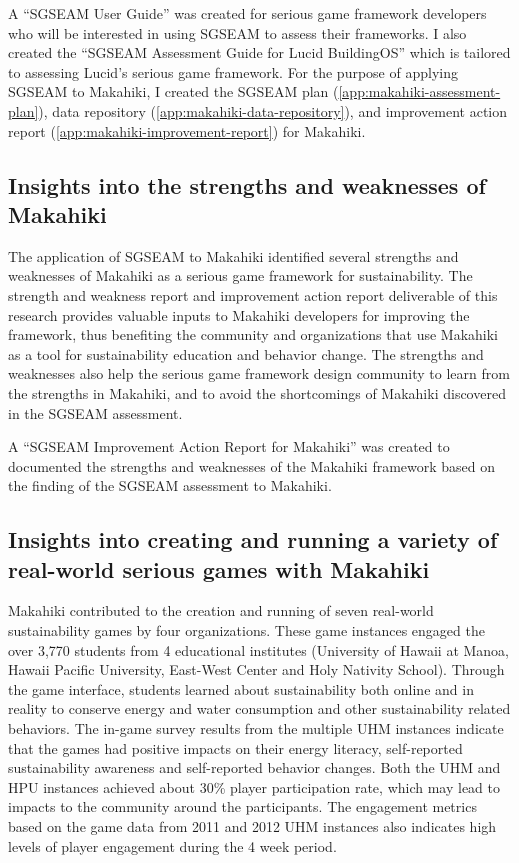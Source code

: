 A ``SGSEAM User Guide'' \cite{csdl2-13-06} was created for serious game framework developers who will be interested in using SGSEAM to assess their frameworks. I also created the ``SGSEAM Assessment Guide for Lucid BuildingOS'' \cite{csdl2-13-07} which is tailored to assessing Lucid's serious game framework.
For the purpose of applying SGSEAM to Makahiki, I created the SGSEAM plan (\autoref{app:makahiki-assessment-plan}), data repository (\autoref{app:makahiki-data-repository}), and improvement action report (\autoref{app:makahiki-improvement-report}) for Makahiki.

\subsection{Insights into the strengths and weaknesses of Makahiki}

The application of SGSEAM to Makahiki identified several strengths and weaknesses of  Makahiki as a serious game framework for sustainability. The strength and weakness report and improvement action report deliverable of this research provides valuable inputs to Makahiki developers for improving the framework, thus benefiting the community and organizations that use Makahiki as a tool for sustainability education and behavior change. The strengths and weaknesses also help the serious game framework design community to learn from the strengths in Makahiki, and to avoid the shortcomings of Makahiki discovered in the SGSEAM assessment. 

A ``SGSEAM Improvement Action Report for Makahiki'' \cite{csdl2-14-12} was created to documented the strengths and weaknesses of the Makahiki framework based on the finding of the SGSEAM assessment to Makahiki.

\subsection{Insights into creating and running a variety of real-world serious games with Makahiki}

Makahiki contributed to the creation and running of seven real-world sustainability games by four  organizations. These game instances engaged the over 3,770 students from 4 educational institutes (University of Hawaii at Manoa, Hawaii Pacific University, East-West Center and Holy Nativity School). Through the game interface, students learned about sustainability both online and in reality to conserve energy and water consumption and other sustainability related behaviors. The in-game survey results from the multiple UHM instances indicate that the games had positive impacts on their energy literacy, self-reported sustainability awareness and self-reported behavior changes. Both the UHM and HPU instances achieved about 30\% player participation rate, which may lead to impacts to the community around the participants. The engagement metrics based on the game data from 2011 and 2012 UHM instances also indicates high levels of player engagement during the 4 week period.

